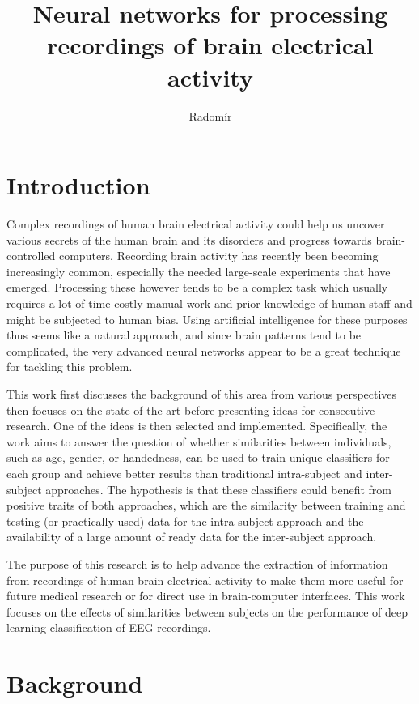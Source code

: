 \documentclass[english, he, bc, kiv, iso690alph, viewonly]{fasthesis}
\author{Radomír}{Kesl}{}{}
\title{Neural networks for processing recordings of brain electrical activity}
\begin{document}
\frontpages[tm]
\tableofcontents


\chapter{Introduction}

Complex recordings of human brain electrical activity could help us uncover various secrets of the human brain and its disorders and progress towards brain-controlled computers.
Recording brain activity has recently been becoming increasingly common, especially the needed large-scale experiments that have emerged. Processing these however tends to be a complex task which usually requires a lot of time-costly manual work and prior knowledge of human staff and might be subjected to human bias. Using artificial intelligence for these purposes thus seems like a natural approach, and since brain patterns tend to be complicated, the very advanced neural networks appear to be a great technique for tackling this problem.

This work first discusses the background of this area from various perspectives then focuses on the state-of-the-art before presenting ideas for consecutive research. One of the ideas is then selected and implemented. Specifically, the work aims to answer the question of whether similarities between individuals, such as age, gender, or handedness, can be used to train unique classifiers for each group and achieve better results than traditional intra-subject and inter-subject approaches. The hypothesis is that these classifiers could benefit from positive traits of both approaches, which are the similarity between training and testing (or practically used) data for the intra-subject approach and the availability of a large amount of ready data for the inter-subject approach.

The purpose of this research is to help advance the extraction of information from recordings of human brain electrical activity to make them more useful for future medical research or for direct use in brain-computer interfaces.
This work focuses on the effects of similarities between subjects on the performance of deep learning classification of EEG recordings.

\chapter{Background}
\end{document}
